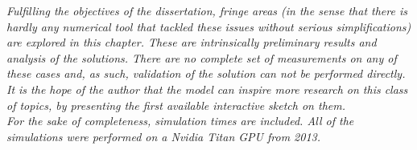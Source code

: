 
\label{cap:chapter_apps}

\textit{Fulfilling the objectives of the dissertation, fringe areas (in the sense that there is hardly any numerical tool that tackled these issues without serious simplifications) are explored in this chapter. These are intrinsically preliminary results and analysis of the solutions. There are no complete set of measurements on any of these cases and, as such, validation of the solution can not be performed directly. It is the hope of the author that the model can inspire more research on this class of topics, by presenting the first available interactive sketch on them.\\
For the sake of completeness, simulation times are included. All of the simulations were performed on a Nvidia Titan GPU from 2013.}


\cleardoublepage
